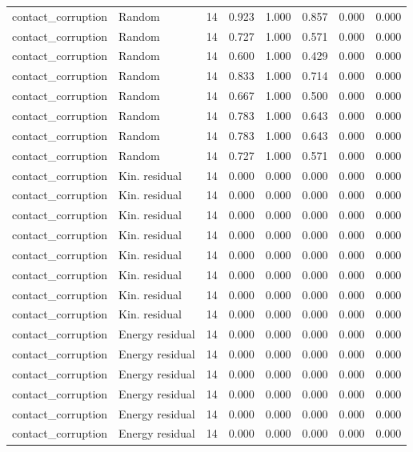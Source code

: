 {\begin{longtable}{llrrrrrr}
contact\_corruption & Random & 14 & 0.923 & 1.000 & 0.857 & 0.000 & 0.000 \\
contact\_corruption & Random & 14 & 0.727 & 1.000 & 0.571 & 0.000 & 0.000 \\
contact\_corruption & Random & 14 & 0.600 & 1.000 & 0.429 & 0.000 & 0.000 \\
contact\_corruption & Random & 14 & 0.833 & 1.000 & 0.714 & 0.000 & 0.000 \\
contact\_corruption & Random & 14 & 0.667 & 1.000 & 0.500 & 0.000 & 0.000 \\
contact\_corruption & Random & 14 & 0.783 & 1.000 & 0.643 & 0.000 & 0.000 \\
contact\_corruption & Random & 14 & 0.783 & 1.000 & 0.643 & 0.000 & 0.000 \\
contact\_corruption & Random & 14 & 0.727 & 1.000 & 0.571 & 0.000 & 0.000 \\
contact\_corruption & Kin. residual & 14 & 0.000 & 0.000 & 0.000 & 0.000 & 0.000 \\
contact\_corruption & Kin. residual & 14 & 0.000 & 0.000 & 0.000 & 0.000 & 0.000 \\
contact\_corruption & Kin. residual & 14 & 0.000 & 0.000 & 0.000 & 0.000 & 0.000 \\
contact\_corruption & Kin. residual & 14 & 0.000 & 0.000 & 0.000 & 0.000 & 0.000 \\
contact\_corruption & Kin. residual & 14 & 0.000 & 0.000 & 0.000 & 0.000 & 0.000 \\
contact\_corruption & Kin. residual & 14 & 0.000 & 0.000 & 0.000 & 0.000 & 0.000 \\
contact\_corruption & Kin. residual & 14 & 0.000 & 0.000 & 0.000 & 0.000 & 0.000 \\
contact\_corruption & Kin. residual & 14 & 0.000 & 0.000 & 0.000 & 0.000 & 0.000 \\
contact\_corruption & Energy residual & 14 & 0.000 & 0.000 & 0.000 & 0.000 & 0.000 \\
contact\_corruption & Energy residual & 14 & 0.000 & 0.000 & 0.000 & 0.000 & 0.000 \\
contact\_corruption & Energy residual & 14 & 0.000 & 0.000 & 0.000 & 0.000 & 0.000 \\
contact\_corruption & Energy residual & 14 & 0.000 & 0.000 & 0.000 & 0.000 & 0.000 \\
contact\_corruption & Energy residual & 14 & 0.000 & 0.000 & 0.000 & 0.000 & 0.000 \\
contact\_corruption & Energy residual & 14 & 0.000 & 0.000 & 0.000 & 0.000 & 0.000 \\

\end{longtable}}
